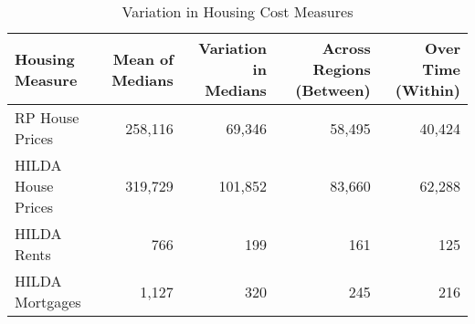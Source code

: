 \begin{table}[htpb]
\centering
\caption{Variation in Housing Cost Measures} 
\label{houseVar}
\begin{tabular}{lrrrr}
  \toprule
\parbox[t]{0.25\textwidth}{\centering Housing Measure} & \parbox[t]{0.12\textwidth}{\centering Mean of Medians} & \parbox[t]{0.12\textwidth}{\centering Variation in Medians} & \parbox[t]{0.16\textwidth}{\centering Across Regions (Between)} & \parbox[t]{0.12\textwidth}{\centering Over Time (Within)} \\ 
  \midrule
RP House Prices & 258,116 & 69,346 & 58,495 & 40,424 \\ 
  HILDA House Prices & 319,729 & 101,852 & 83,660 & 62,288 \\ 
  HILDA Rents & 766 & 199 & 161 & 125 \\ 
  HILDA Mortgages & 1,127 & 320 & 245 & 216 \\ 
   \bottomrule
\end{tabular}
\end{table}
